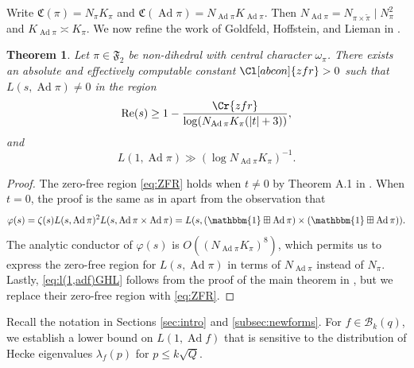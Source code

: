 \documentclass[12pt,reqno]{amsart}
\newtheorem{thm}{Theorem}[section]
\theoremstyle{remark}
\DeclareMathOperator{\ad}{Ad}
\numberwithin{equation}{section}
\begin{document}
    Write $\mathfrak{C}(\pi) = N_{\pi}K_{\pi}$ and $\mathfrak{C}(\ad \pi) = N_{\ad \pi}K_{\ad \pi}$. Then $N_{\ad \pi} = N_{\pi \times \widetilde{\pi}}\mid N_{\pi}^2$ and $K_{\ad \pi} \asymp K_{\pi}$. We now refine the work of Goldfeld, Hoffstein, and Lieman in \cite[Appendix]{HJLP}. 
   
    \begin{thm}
    \label{thm:L(1,adf)}
    Let $\pi \in \mathfrak{F}_2$ be  non-dihedral with central character $\omega_{\pi}$.  There exists an absolute and effectively computable constant $\Cl[abcon]{zfr} >0$ such that $L(s,\ad \pi)\neq 0$ in the region
    \begin{equation}
    \label{eq:ZFR}
    \mathrm{Re}(s)\geq 1-\frac{\Cr{zfr}}{\log(N_{\ad \pi}K_{\pi}(|t|+3))},
    \end{equation} and \begin{equation}\label{eq:l(1,adf)GHL}
    L(1, \ad \pi) \gg (\log N_{\ad \pi}K_{\pi})^{-1}.
     \end{equation}
    \end{thm}
    \begin{proof}
    The zero-free region \eqref{eq:ZFR} holds when $t\neq 0$ by Theorem A.1 in \cite[Appendix]{Humphries}.  When $t=0$, the proof is the same as in \cite[Appendix]{HJLP} apart from the observation that
    \[
        \varphi(s) = \zeta(s) L(s,\ad\pi)^2 L(s,\ad\pi\times\ad\pi) = L(s,(\mathbbm{1}\boxplus \ad\pi)\times(\mathbbm{1}\boxplus \ad\pi)).
    \]
    The analytic conductor of $\varphi(s)$ is $O((N_{\ad\pi}K_{\pi})^8)$, which permits us to express the zero-free region for $L(s,\ad\pi)$ in terms of $N_{\ad\pi}$ instead of $N_{\pi}$.  Lastly, \eqref{eq:l(1,adf)GHL} follows from the proof of the main theorem in \cite[Appendix]{HJLP}, but we replace their zero-free region with \eqref{eq:ZFR}.
  \end{proof}

       

        Recall the notation in Sections \ref{sec:intro} and \ref{subsec:newforms}. For $f \in \mathcal{B}_k(q)$, we establish a lower bound on $L(1,\ad f)$ that is sensitive to the distribution of Hecke eigenvalues $\lambda_f(p)$ for $p\leq k\sqrt{Q}$.
        
\end{document}
